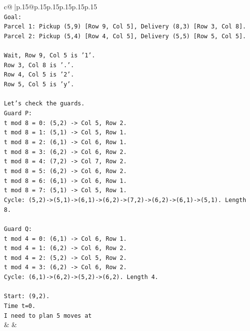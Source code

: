 \documentclass{article}
\begin{document}
{\begin{supertabular}{c@{$\;$}|p{.15\linewidth}@{}p{.15\linewidth}p{.15\linewidth}p{.15\linewidth}p{.15\linewidth}p{.15\linewidth}}
{{{\\ 
\texttt{Goal:} \\
\texttt{Parcel 1: Pickup (5,9) {[}Row 9, Col 5{]}, Delivery (8,3) {[}Row 3, Col 8{]}.} \\
\texttt{Parcel 2: Pickup (5,4) {[}Row 4, Col 5{]}, Delivery (5,5) {[}Row 5, Col 5{]}.} \\
\\ 
\texttt{Wait, Row 9, Col 5 is '1'.} \\
\texttt{Row 3, Col 8 is '.'.} \\
\texttt{Row 4, Col 5 is '2'.} \\
\texttt{Row 5, Col 5 is 'y'.} \\
\\ 
\texttt{Let's check the guards.} \\
\texttt{Guard P:} \\
\texttt{t mod 8 = 0: (5,2) {-}> Col 5, Row 2.} \\
\texttt{t mod 8 = 1: (5,1) {-}> Col 5, Row 1.} \\
\texttt{t mod 8 = 2: (6,1) {-}> Col 6, Row 1.} \\
\texttt{t mod 8 = 3: (6,2) {-}> Col 6, Row 2.} \\
\texttt{t mod 8 = 4: (7,2) {-}> Col 7, Row 2.} \\
\texttt{t mod 8 = 5: (6,2) {-}> Col 6, Row 2.} \\
\texttt{t mod 8 = 6: (6,1) {-}> Col 6, Row 1.} \\
\texttt{t mod 8 = 7: (5,1) {-}> Col 5, Row 1.} \\
\texttt{Cycle: (5,2){-}>(5,1){-}>(6,1){-}>(6,2){-}>(7,2){-}>(6,2){-}>(6,1){-}>(5,1). Length 8.} \\
\\ 
\texttt{Guard Q:} \\
\texttt{t mod 4 = 0: (6,1) {-}> Col 6, Row 1.} \\
\texttt{t mod 4 = 1: (6,2) {-}> Col 6, Row 2.} \\
\texttt{t mod 4 = 2: (5,2) {-}> Col 5, Row 2.} \\
\texttt{t mod 4 = 3: (6,2) {-}> Col 6, Row 2.} \\
\texttt{Cycle: (6,1){-}>(6,2){-}>(5,2){-}>(6,2). Length 4.} \\
\\ 
\texttt{Start: (9,2).} \\
\texttt{Time t=0.} \\
\texttt{I need to plan 5 moves at} \\
            }
        }
    }
    & & \\ \\


\end{supertabular}}
\end{document}
